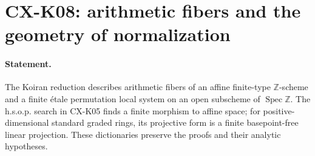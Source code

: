 
\section{CX-K08: arithmetic fibers and the geometry of normalization}
\label{cx:k08}

\paragraph{Statement.}
The Koiran reduction describes arithmetic fibers of an affine
finite-type $\mathbb Z$-scheme and a finite \'etale permutation local
system on an open subscheme of $\operatorname{Spec}\mathbb Z$.
The h.s.o.p. search in CX-K05 finds a finite morphism to affine space;
for positive-dimensional standard graded rings, its projective form
is a finite basepoint-free linear projection. These dictionaries
preserve the proofs and their analytic hypotheses.

